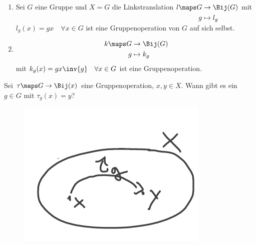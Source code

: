\begin{beispiel}\label{operation:beispiele}
    \begin{enumerate}
        \item \label{operation:beispiele:linkstranslation} Sei \( G \) eine Gruppe und \( X=G \) die Linkstranslation \( l\maps \begin{aligned}[t] 
            G&\to \Bij(G)\\
            g&\mapsto l_g
        \end{aligned} \) mit \( l_g(x)=gx \quad\forall x\in G \) ist eine Gruppenoperation von \( G \) auf sich selbst.
        
        \item \label{operation:beispiele:konjugation}\begin{align*}
            k\maps \begin{aligned}[t] 
                G &\to \Bij(G)\\
                g &\mapsto k_g
            \end{aligned}
        \end{align*}
        mit \( k_g(x)=gx\inv{g} \quad\forall x\in G \) ist eine Gruppenoperation.
    \end{enumerate}
\end{beispiel}
\begin{frage*}
    Sei \( \tau\maps G\to \Bij(x) \) eine Gruppenoperation, \( x,y\in X \). 
    Wann gibt es ein \( g\in G \) mit \( \tau_g(x)=y \)?
    \begin{figure}[H]
        \centering
        \includegraphics[width=0.5\linewidth]{figures/einfach_transitiv}
        \label{fig:einfach_transitiv}
    \end{figure}
    
\end{frage*}

